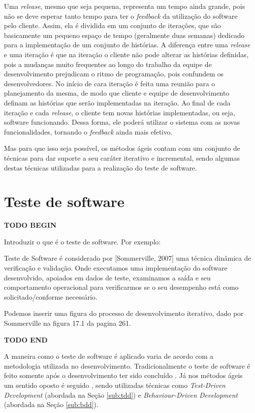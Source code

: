 Uma \textit{release}, mesmo que seja pequena, representa um tempo ainda grande, pois não se deve esperar tanto tempo para ter o \textit{feedback} da utilização do software pelo cliente. Assim, ela é dividida em um conjunto de iterações, que são basicamente um pequeno espaço de tempo (geralmente duas semanas) dedicado para a implementação de um conjunto de histórias. A diferença entre uma \textit{release} e uma iteração é que na iteração o cliente não pode alterar as histórias definidas, pois a mudanças muito frequentes ao longo do trabalho da equipe de desenvolvimento prejudicam o ritmo de programação, pois confundem os desenvolvedores. No início de cara iteração é feita uma reunião para o planejamento da mesma, de modo que cliente e equipe de desenvolvimento definam as histórias que serão implementadas na iteração. Ao final de cada iteração e cada \textit{release}, o cliente tem novas histórias implementadas, ou seja, software funcionando. Dessa forma, ele poderá utilizar o sistema com as novas funcionalidades, tornando o \textit{feedback} ainda mais efetivo.

Mas para que isso seja possível, os métodos ágeis contam com um conjunto de técnicas para dar suporte a seu caráter iterativo e incremental, sendo algumas destas técnicas utilizadas para a realização do teste de software.


\section{Teste de software}
\label{sec:teste_de_software}

\textbf{TODO BEGIN}

Introduzir o que é o teste de software. Por exemplo:

Teste de Software é considerado por [Sommerville, 2007] uma técnica dinâmica de verificação e validação. Onde executamos uma implementação do software desenvolvido, apoiados em dados de teste, examinamos a saída e seu comportamento operacional para verificarmos se o seu desempenho está como solicitado/conforme necessário.

Podemos inserir uma figura do processo de desenvolvimento iterativo, dado por Sommerville na figura 17.1 da pagina 261.

\textbf{TODO END}

A maneira como o teste de software é aplicado varia de acordo com a metodologia utilizada no desenvolvimento. Tradicionalmente o teste de software é feito somente após o desenvolvimento ter sido concluído \cite{TesteSoftware, Pressman}. Já nos métodos ágeis um sentido oposto é seguido \cite{ArtOfAgileDevelopment}, sendo utilizadas técnicas como \textit{Test-Driven Development} (abordada na Seção \ref{sub:tdd}) e \textit{Behaviour-Driven Development} (abordada na Seção \ref{sub:bdd}).

